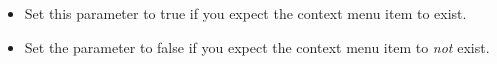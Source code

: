 
\begin{itemize}
\item Set this parameter to true if you expect the context menu item to exist.
\item Set the parameter to false if you expect the context menu item to \emph{not} exist. 
\end{itemize}

    
